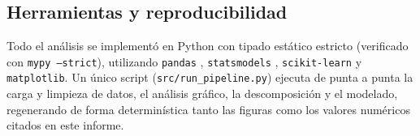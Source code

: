 \subsection{Herramientas y reproducibilidad}

Todo el análisis se implementó en Python con tipado estático estricto (verificado con
\texttt{mypy --strict}), utilizando \texttt{pandas} \citep{mckinney2010pandas},
\texttt{statsmodels} \citep{seabold2010statsmodels}, \texttt{scikit-learn} y
\texttt{matplotlib}. Un único script (\texttt{src/run\_pipeline.py}) ejecuta de punta a punta
la carga y limpieza de datos, el análisis gráfico, la descomposición y el modelado,
regenerando de forma determinística tanto las figuras como los valores numéricos citados en
este informe.
